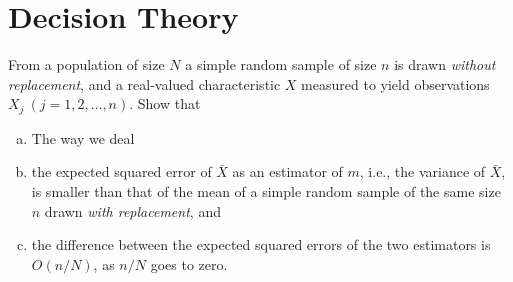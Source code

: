 \chapter{Decision Theory}
\begin{exer}
	From a population of size $N$ a simple random sample of size $n$ is drawn \textit{without replacement}, and a real-valued characteristic $X$ measured to yield observations $X_j~(j=1,2,\ldots,n)$. Show that
	\begin{enumerate}[(a)]
		\item 
		The way we deal
		\item the expected squared error of $\bar{X}$ as an estimator of $m$, i.e., the variance of $\bar{X}$, is smaller than that of the mean of a simple random sample of the same size $n$ drawn \textit{with replacement}, and
		\item the difference between the expected squared errors of the two estimators is $O(n/N)$, as $n/N$ goes to zero.
	\end{enumerate}
\end{exer}
